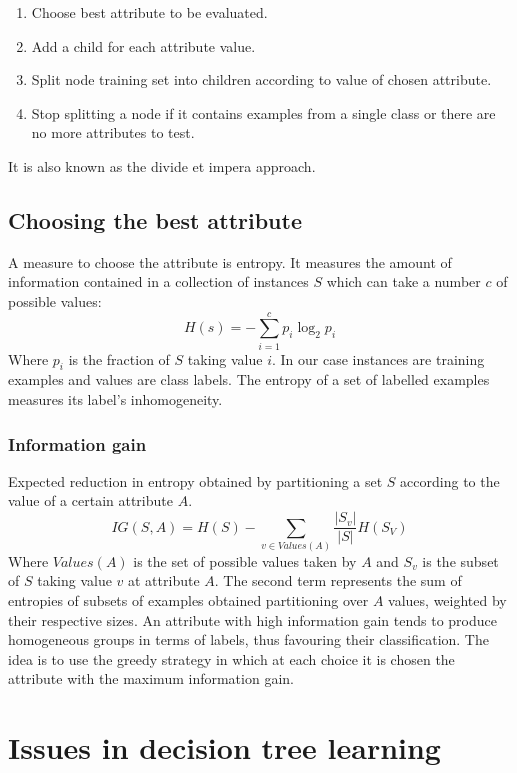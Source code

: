 	\begin{multicols}{2}
		\begin{enumerate}
			\item Choose best attribute to be evaluated.
			\item Add a child for each attribute value.
			\item Split node training set into children according to value of chosen attribute.
			\item Stop splitting a node if it contains examples from a single class or there are no more attributes to test.
		\end{enumerate}
	\end{multicols}

	It is also known as the divide et impera approach.

	\subsection{Choosing the best attribute}
	A measure to choose the attribute is entropy.
	It measures the amount of information contained in a collection of instances $S$ which can take a number $c$ of possible  values:
	$$H(s) = -\sum\limits_{i=1}^c p_i\log_2 p_i$$
	Where $p_i$ is the fraction of $S$ taking value $i$.
	In our case instances are training examples and values are class labels.
	The entropy of a set of labelled examples measures its label's inhomogeneity.

		\subsubsection{Information gain}
		Expected reduction in entropy obtained by partitioning a set $S$ according to the value of a certain attribute $A$.
		$$IG(S,A) = H(S) - \sum\limits_{v\in Values(A)}\dfrac{|S_v|}{|S|}H(S_V)$$
		Where $Values(A)$ is the set of possible values taken by $A$ and $S_v$ is the subset of $S$ taking value $v$ at attribute $A$.
		The second term represents the sum of entropies of subsets of examples obtained partitioning over $A$ values, weighted by their respective sizes.
		An attribute with high information gain tends to produce homogeneous groups in terms of labels, thus favouring their classification.
		The idea is to use the greedy strategy in which at each choice it is chosen the attribute with the maximum information gain.

\section{Issues in decision tree learning}
